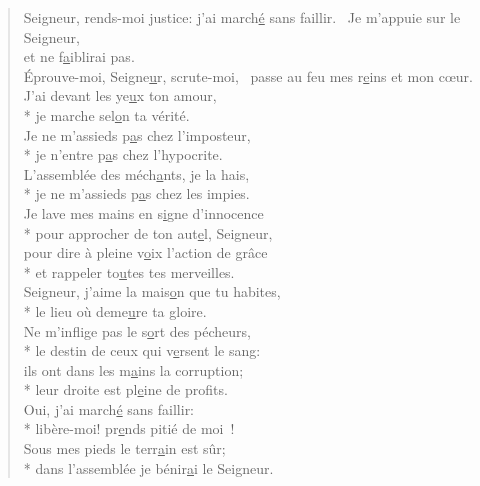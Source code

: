 
\begin{verse}
Seigneur, rends-moi justice:
j’ai march\underline{é} sans faillir.~\psalmstar
Je m’appuie sur le Seigneur, \\
et ne f\underline{a}iblirai pas. \\
Éprouve-moi, Seigne\underline{u}r, scrute-moi,~\psalmstar
passe au feu mes r\underline{e}ins et mon cœur. \\

J’ai devant les ye\underline{u}x ton amour, \\*
je marche sel\underline{o}n ta vérité. \\
Je ne m’assieds p\underline{a}s chez l’imposteur, \\*
je n’entre p\underline{a}s chez l’hypocrite. \\
L’assemblée des méch\underline{a}nts, je la hais, \\*
je ne m’assieds p\underline{a}s chez les impies. \\

Je lave mes mains en s\underline{i}gne d’innocence \\*
pour approcher de ton aut\underline{e}l, Seigneur, \\
pour dire à pleine v\underline{o}ix l’action de grâce \\*
et rappeler to\underline{u}tes tes merveilles. \\
Seigneur, j’aime la mais\underline{o}n que tu habites, \\*
le lieu où deme\underline{u}re ta gloire. \\

Ne m’inflige pas le s\underline{o}rt des pécheurs, \\*
le destin de ceux qui v\underline{e}rsent le sang: \\
ils ont dans les m\underline{a}ins la corruption; \\*
leur droite est pl\underline{e}ine de profits. \\

Oui, j’ai march\underline{é} sans faillir: \\*
libère-moi! pr\underline{e}nds pitié de moi ! \\
Sous mes pieds le terr\underline{a}in est sûr; \\*
dans l’assemblée je bénir\underline{a}i le Seigneur. \\
\end{verse}

